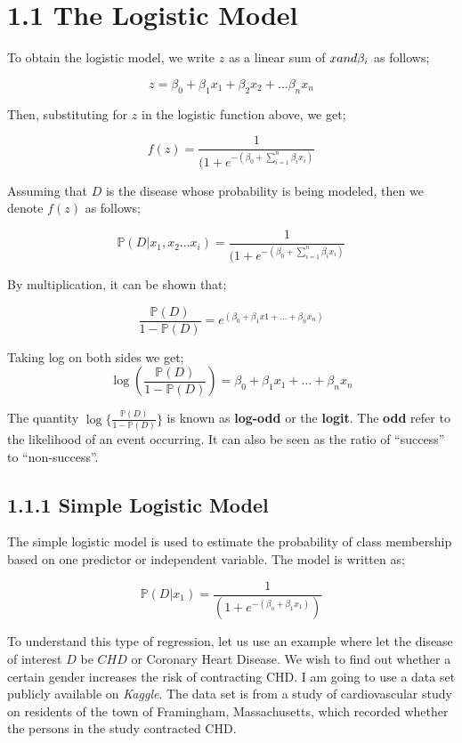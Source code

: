 \documentclass[
]{article}
\begin{document}
\hypertarget{the-logistic-model}{%
\section{1.1 The Logistic Model}\label{the-logistic-model}}

To obtain the logistic model, we write \(z\) as a linear sum of
\(x\space\space and \space\space \beta_i\) as follows;

\[z=\beta_0+\beta_1x_1+\beta_2x_2+\dots\beta_nx_n\]

Then, substituting for \(z\) in the logistic function above, we get;

\[f(z)=\frac{1}{(1+e^{-(\beta_0+\sum_{i=1}^n\beta_i x_i)}}\]

Assuming that \(D\) is the disease whose probability is being modeled,
then we denote \(f(z)\) as follows;

\[\mathbb{P}(D|x_1,x_2\dots x_i)=\frac{1}{(1+e^{-(\beta_0+\sum_{i=1}^n\beta_i x_i)}}\]

By multiplication, it can be shown that;

\[\frac{\mathbb{P}(D)}{1-\mathbb{P}(D)}=e^{(\beta_0+\beta_1x1+\dots+\beta_nx_n)}\]

Taking log on both sides we get;
\[\log(\frac{\mathbb{P}(D)}{1-\mathbb{P}(D)})=\beta_0+\beta_1x_1+\dots+\beta_nx_n\]

The quantity \(\log\{\frac{\mathbb{P}(D)}{1-\mathbb{P}(D)}\}\) is known
as \textbf{log-odd} or the \textbf{logit}. The \textbf{odd} refer to the
likelihood of an event occurring. It can also be seen as the ratio of
``success'' to ``non-success''.

\hypertarget{simple-logistic-model}{%
\subsection{1.1.1 Simple Logistic Model}\label{simple-logistic-model}}

The simple logistic model is used to estimate the probability of class
membership based on one predictor or independent variable. The model is
written as;

\[\mathbb{P}(D|x_1)=\frac{1}{(1+e^{-(\beta_o+\beta_1x_1)})}\]

To understand this type of regression, let us use an example where let
the disease of interest \(D\) be \(CHD\) or Coronary Heart Disease. We
wish to find out whether a certain gender increases the risk of
contracting CHD. I am going to use a data set publicly available on
\emph{Kaggle}. The data set is from a study of cardiovascular study on
residents of the town of Framingham, Massachusetts, which recorded
whether the persons in the study contracted CHD.
\end{document}
